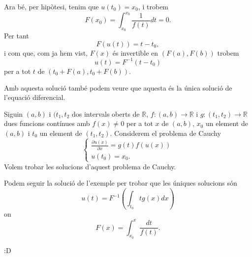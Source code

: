 \documentclass[../Apunts.tex]{subfiles}
\begin{document}
\begin{example}
\begin{solution}
			Ara bé, per hipòtesi, tenim que \(u(t_{0})=x_{0}\), i trobem
			\[F(x_{0})=\int_{x_{0}}^{x_{0}}\frac{1}{f(t)}dt=0.\]
			Per tant
			\[F(u(t))=t-t_{0},\]
			i com que, com ja hem vist, \(F(x)\) és invertible en \((F(a),F(b))\) trobem
			\[u(t)=F^{-1}(t-t_{0})\]
			per a tot \(t\) de \((t_{0}+F(a), t_{0}+F(b))\).
			
			Amb aquesta solució també podem veure que aquesta és la única solució de l'equació diferencial.
		\end{solution}
	\end{example}
	\begin{example}
		\label{ex:Equacions de variables separades}
		Siguin \((a,b)\) i \((t_{1},t_{2}\) dos intervals oberts de \(\mathbb{R}\), \(f\colon(a,b)\longrightarrow\mathbb{R}\) i \(g\colon(t_{1},t_{2})\longrightarrow\mathbb{R}\) dues funcions contínues amb \(f(x)\neq0\) per a tot \(x\) de \((a,b)\), \(x_{0}\) un element de \((a,b)\) i \(t_{0}\) un element de \((t_{1},t_{2})\). Considerem el problema de Cauchy
		\begin{equation}
			\begin{cases}
				\displaystyle \frac{\partial u(x)}{\partial x}=g(t)f(u(x)) \\
				\displaystyle u(t_{0})=x_{0}.
			\end{cases}
		\end{equation}
		Volem trobar les solucions d'aquest problema de Cauchy.
		\begin{solution}
			Podem seguir la solució de l'exemple  per trobar que les úniques solucions són
			\[u(t)=F^{-1}\left(\int_{t_{0}}{t}g(x)dx\right)\]
			on
			\[F(x)=\int_{x_{0}}^{x}\frac{dt}{f(t)}.\]
		\end{solution}
	\end{example}
	\begin{example}
		\label{ex:Equacions diferencials lineals}
		:D
	\end{example}
\end{document}
